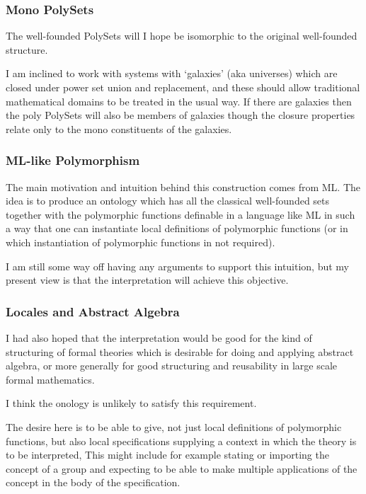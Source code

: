 \documentclass[numreferences]{rbjk}
\begin{document}
\begin{article}
\subsubsection{Mono PolySets}

The well-founded PolySets will I hope be isomorphic to the original well-founded structure.

I am inclined to work with systems with `galaxies' (aka universes) which are closed under power set union and replacement, and these should allow traditional mathematical domains to be treated in the usual way.
If there are galaxies then the poly PolySets will also be members of galaxies though the closure properties relate only to the mono constituents of the galaxies.

\subsubsection{ML-like Polymorphism}

The main motivation and intuition behind this construction comes from ML.
The idea is to produce an ontology which has all the classical well-founded sets together with the polymorphic functions definable in a language like ML in such a way that one can instantiate local definitions of polymorphic functions (or in which instantiation of polymorphic functions in not required).

I am still some way off having any arguments to support this intuition, but my present view is that the interpretation will achieve this objective.

\subsubsection{Locales and Abstract Algebra}

I had also hoped that the interpretation would be good for the kind of structuring of formal theories which is desirable for doing and applying abstract algebra, or more generally for good structuring and reusability in large scale formal mathematics.

I think the onology is unlikely to satisfy this requirement.

The desire here is to be able to give, not just local definitions of polymorphic functions, but also local specifications supplying a context in which the theory is to be interpreted,
This might include for example stating or importing the concept of a group and expecting to be able to make multiple applications of the concept in the body of the specification.


\end{article}
\end{document}
